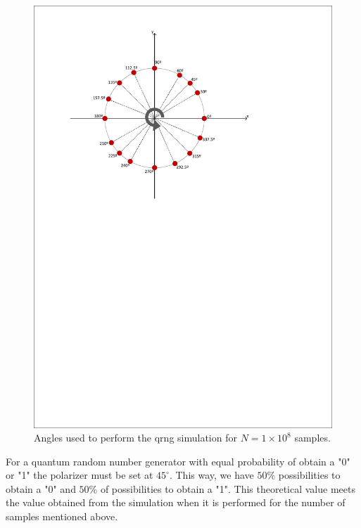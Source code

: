 \begin{figure}[h]
    \centering
        \includegraphics[clip, trim=0.5cm 15.5cm 2.5cm 1cm, width=1.00\textwidth]{./sdf/qrng/figures_raw/sphere.pdf}
    \caption{Angles used to perform the qrng simulation for $N=1 \times 10^{8}$ samples. }\label{sphere}
\end{figure}

For a quantum random number generator with equal probability of obtain a "0" or "1" the polarizer must be set at $45^{\circ}$. This way, we have $50\%$ possibilities to obtain a "0" and $50\%$ of possibilities to obtain a "1". This theoretical value meets the value obtained from the simulation when it is performed for the number of samples mentioned above.

